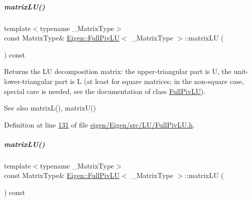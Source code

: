 \mbox{\label{group___l_u___module_afea0b8fc707a9097d46fe358cb18bbff}} 
\subparagraph{\texorpdfstring{matrix\+L\+U()}{matrixLU()}\hspace{0.1cm}{\footnotesize\ttfamily [1/2]}}
{\footnotesize\ttfamily template$<$typename \+\_\+\+Matrix\+Type$>$ \\
const Matrix\+Type\& \hyperlink{group___l_u___module_class_eigen_1_1_full_piv_l_u}{Eigen\+::\+Full\+Piv\+LU}$<$ \+\_\+\+Matrix\+Type $>$\+::matrix\+LU (\begin{DoxyParamCaption}{ }\end{DoxyParamCaption}) const\hspace{0.3cm}{\ttfamily [inline]}}

\begin{DoxyReturn}{Returns}
the LU decomposition matrix\+: the upper-\/triangular part is U, the unit-\/lower-\/triangular part is L (at least for square matrices; in the non-\/square case, special care is needed, see the documentation of class \hyperlink{group___l_u___module_class_eigen_1_1_full_piv_l_u}{Full\+Piv\+LU}).
\end{DoxyReturn}
\begin{DoxySeeAlso}{See also}
matrix\+L(), matrix\+U() 
\end{DoxySeeAlso}


Definition at line \hyperlink{eigen_2_eigen_2src_2_l_u_2_full_piv_l_u_8h_source_l00131}{131} of file \hyperlink{eigen_2_eigen_2src_2_l_u_2_full_piv_l_u_8h_source}{eigen/\+Eigen/src/\+L\+U/\+Full\+Piv\+L\+U.\+h}.

\mbox{\label{group___l_u___module_afea0b8fc707a9097d46fe358cb18bbff}} 
\subparagraph{\texorpdfstring{matrix\+L\+U()}{matrixLU()}\hspace{0.1cm}{\footnotesize\ttfamily [2/2]}}
{\footnotesize\ttfamily template$<$typename \+\_\+\+Matrix\+Type$>$ \\
const Matrix\+Type\& \hyperlink{group___l_u___module_class_eigen_1_1_full_piv_l_u}{Eigen\+::\+Full\+Piv\+LU}$<$ \+\_\+\+Matrix\+Type $>$\+::matrix\+LU (\begin{DoxyParamCaption}{ }\end{DoxyParamCaption}) const\hspace{0.3cm}{\ttfamily [inline]}}

